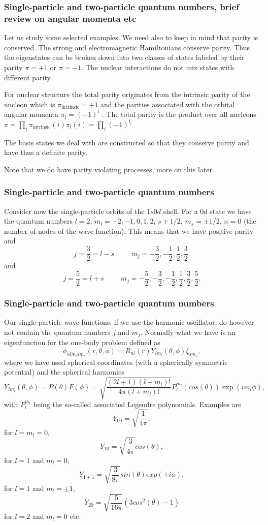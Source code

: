 \documentclass[compress]{beamer}
\begin{document}
\frame
{
\frametitle{Single-particle and two-particle quantum numbers, brief review on angular momenta etc}

\begin{small}
{\scriptsize
Let us study some selected examples. We need also to keep in mind that parity is conserved.
The strong and electromagnetic Hamiltonians conserve parity. Thus the eigenstates can be
broken down into two classes of states labeled by their parity $\pi= +1$ or $\pi=-1$.
The nuclear interactions do not mix states with different parity.

For nuclear structure the total parity originates
from the intrinsic parity of the nucleon which is $\pi_{\mathrm{intrinsic}}=+1$ 
and the parities associated with
the orbital angular momenta $\pi_l=(-1)^l$ . The total parity is the product over all nucleons
$\pi = \prod_i \pi_{\mathrm{intrinsic}}(i)\pi_l(i) = \prod_i (-1)^{l_i}$

The basis states we deal with are constructed so that they conserve parity and have thus a definite parity. 

Note that we do have parity violating processes, more on this later. 
}
\end{small}
}


\frame
{
\frametitle{Single-particle and two-particle quantum numbers}

\begin{small}
{\scriptsize
Consider now the single-particle orbits of the $1s0d$ shell. 
For a $0d$ state we have the quantum numbers $l=2$, $m_l=-2,-1,0,1,2$, $s+1/2$, $m_s=\pm 1/2$,
$n=0$ (the number of nodes of the wave function).   This means that we have positive parity and
\[
j=\frac{3}{2}=l-s\hspace{1cm} m_j=-\frac{3}{2},-\frac{1}{2},\frac{1}{2},\frac{3}{2}.
\]
and
\[
j=\frac{5}{2}=l+s\hspace{1cm} m_j=-\frac{5}{2},-\frac{3}{2},-\frac{1}{2},\frac{1}{2},\frac{3}{2},\frac{5}{2}.
\]
}
\end{small}
}



\frame
{
\frametitle{Single-particle and two-particle quantum numbers}

\begin{small}
{\scriptsize
Our single-particle wave functions, if we use the harmonic oscillator, do however not contain the quantum numbers $j$ and $m_j$.
Normally what we have is an eigenfunction for the one-body problem defined as
\[
\phi_{nlm_lsm_s}(r,\theta,\phi)=R_{nl}(r)Y_{lm_l}(\theta,\phi)\xi_{sm_s},
\]
where we have used spherical coordinates (with a spherically symmetric potential) and the spherical harmonics 
\[
    Y_{lm_l}(\theta,\phi)=P(\theta)F(\phi)=\sqrt{\frac{(2l+1)(l-m_l)!}{4\pi (l+m_l)!}}
                      P_l^{m_l}(cos(\theta))\exp{(im_l\phi)},
\]
with $P_l^{m_l}$ being the so-called associated Legendre polynomials. 
Examples are
\[
   Y_{00}=\sqrt{\frac{1}{4\pi}},
\]
for $l=m_l=0$, 
\[
   Y_{10}=\sqrt{\frac{3}{4\pi}}cos(\theta),
\]
for $l=1$ and $m_l=0$, 
\[
   Y_{1\pm 1}=\sqrt{\frac{3}{8\pi}}sin(\theta)exp(\pm i\phi),
\]
for  $l=1$ and $m_l=\pm 1$, 
\[
   Y_{20}=\sqrt{\frac{5}{16\pi}}(3cos^2(\theta)-1)
\]
for $l=2$ and $m_l=0$ etc. 
}
\end{small}
}
\end{document}
